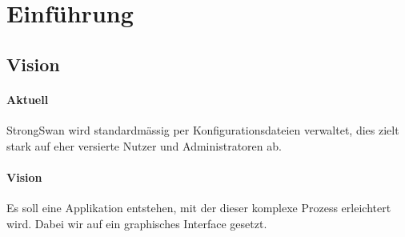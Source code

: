 \section{Einführung}
\subsection{Vision}
\label{subsec:vision}
\paragraph{Aktuell}
StrongSwan wird standardmässig per Konfigurationsdateien verwaltet, dies zielt stark auf eher versierte Nutzer und Administratoren ab.\\

\paragraph{Vision} 
Es soll eine Applikation entstehen, mit der dieser komplexe Prozess erleichtert wird. Dabei wir auf ein graphisches Interface gesetzt.\\